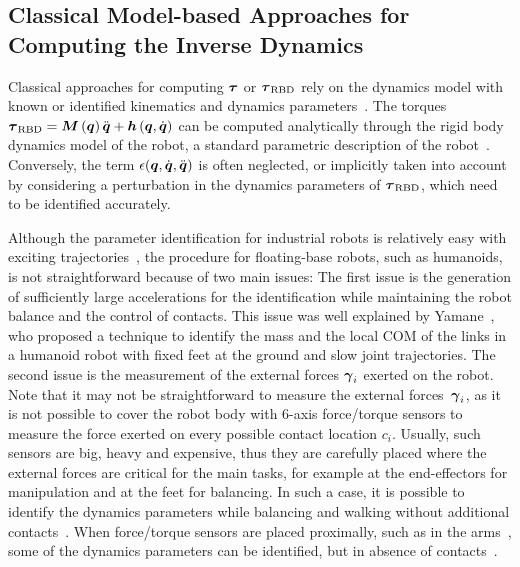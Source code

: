 
\subsection{Classical Model-based Approaches for Computing the Inverse Dynamics}

	Classical approaches for computing $\boldsymbol{\tau}$ or $\boldsymbol{\tau}_\text{RBD}$ rely on the dynamics model with known or identified kinematics and dynamics parameters~\cite{Ivaldi2011}. 
   	The torques $\boldsymbol{\tau}_\text{RBD} = \boldsymbol M \left( \boldsymbol q \right)\ddot{\boldsymbol q} + \boldsymbol{h} \left(\boldsymbol q,\dot{\boldsymbol q} \right)$ can be computed analytically through the rigid body dynamics model of the robot, a standard parametric description of the robot~\cite{Featherstone2008}. 
   	Conversely, the term $\epsilon(\boldsymbol q,\dot{\boldsymbol q},\ddot{\boldsymbol q})$ is often neglected, or implicitly taken into account by considering a perturbation in the dynamics parameters of $\boldsymbol{\tau}_\text{RBD}$, which need to be identified accurately.







	Although the parameter identification for industrial robots is relatively easy with exciting trajectories~\cite{Pedrocchi2014}, the procedure for floating-base robots, such as humanoids, is not straightforward because of two main issues: 
      The first issue is the generation of sufficiently large accelerations for the identification while maintaining the robot balance and the control of contacts. 
      This issue was well explained by Yamane~\cite{yamane2011}, who proposed a technique to identify the mass and the local COM of the links in a humanoid robot with fixed feet at the ground and slow joint trajectories. 
      The second issue is the measurement of the external forces $\boldsymbol{\gamma}_i$ exerted on the robot.
      Note that it may not be straightforward to measure the external forces~$\boldsymbol{\gamma}_i$, as it is not possible to cover the robot body with 6-axis force/torque sensors to measure the force exerted on every possible contact location $c_i$. Usually, such sensors are big, heavy and expensive, thus they are carefully placed where the external forces are critical for the main tasks, for example at the end-effectors for manipulation and at the feet for balancing.
      In such a case, it is possible to identify the dynamics parameters while balancing and walking without additional contacts~\cite{Ogawa2014}.
      When force/torque sensors are placed proximally, such as in the \robot{} arms~\cite{Fumagalli2012}, some of the dynamics parameters can be identified, but in absence of contacts~\cite{Traversaro2013}.

